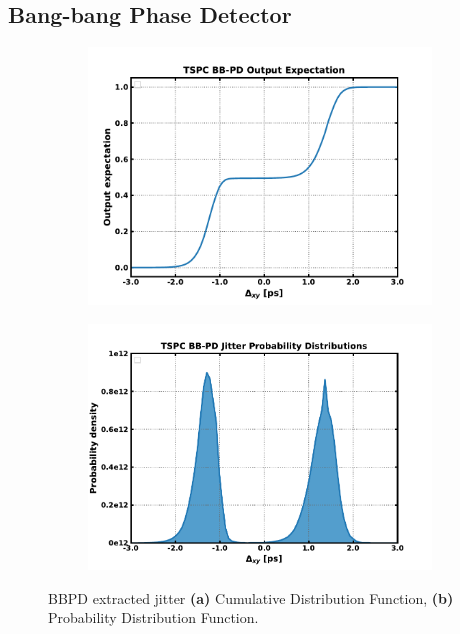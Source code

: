 \subsection{Bang-bang Phase Detector}\label{sec:res_bbpd}
	\begin{figure}[htb!]
	    \centering
	    \begin{subfigure}{0.5\textwidth}
	        \centering
	        \includegraphics[width=1\textwidth, angle=0]{./figs/results/cdf}
	        \caption{ }
	        \label{fig:bbpd_cdf}
	    \end{subfigure}%
	    \begin{subfigure}{0.5\textwidth}
	        \centering
	        \includegraphics[width=1\textwidth, angle=0]{./figs/results/pdf}
	        \caption{ }
	        \label{fig:bbpd_pdf}
	    \end{subfigure}
	    \label{fig:bbpd_jitter_dist}
	    \caption{BBPD extracted jitter \textbf{(a)} Cumulative Distribution Function, \textbf{(b)} Probability Distribution Function.}
	\end{figure} 
